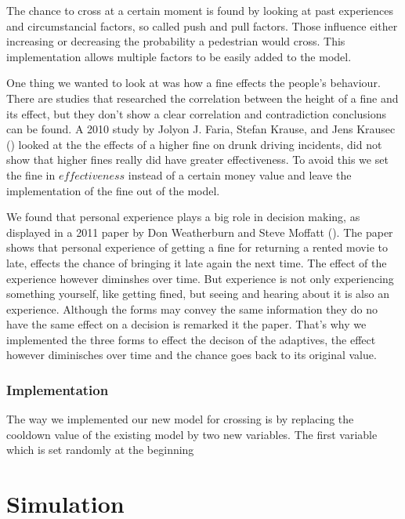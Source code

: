 \documentclass[a4paper]{article}
\begin{document}
The chance to cross at a certain moment is found by looking at past experiences and circumstancial factors, so called push and pull factors. Those influence either increasing or decreasing the probability a pedestrian would cross. This implementation allows multiple factors to be easily added to the model.

One thing we wanted to look at was how a fine effects the people's behaviour. There are studies that researched the correlation between the height of a fine and its effect, but they don't show a clear correlation and contradiction conclusions can be found. A 2010 study by Jolyon J. Faria, Stefan Krause, and Jens Krausec (\cite{drunkdrivers}) looked at the the effects of a higher fine on drunk driving incidents, did not show that higher fines really did have greater effectiveness. To avoid this we set the fine in $effectiveness$ instead of a certain money value and leave the implementation of the fine out of the model. 

We found that personal experience plays a big role in decision making, as displayed in a 2011 paper by Don Weatherburn and Steve Moffatt (\cite{movies}). The paper shows that personal experience of getting a fine for returning a rented movie to late, effects the chance of bringing it late again the next time. The effect of the experience however diminshes over time. But experience is not only experiencing something yourself, like getting fined, but seeing and hearing about it is also an experience. Although the forms may convey the same information they do no have the same effect on a decision is remarked it the paper. That's why we implemented the three forms to effect the decison of the adaptives, the effect however diminisches over time and the chance goes back to its original value.

\subsubsection{Implementation}

The way we implemented our new model for crossing is by replacing the cooldown value of the existing model by two new variables. The first variable which is set randomly at the beginning 

\clearpage

\section{Simulation}
\end{document}
